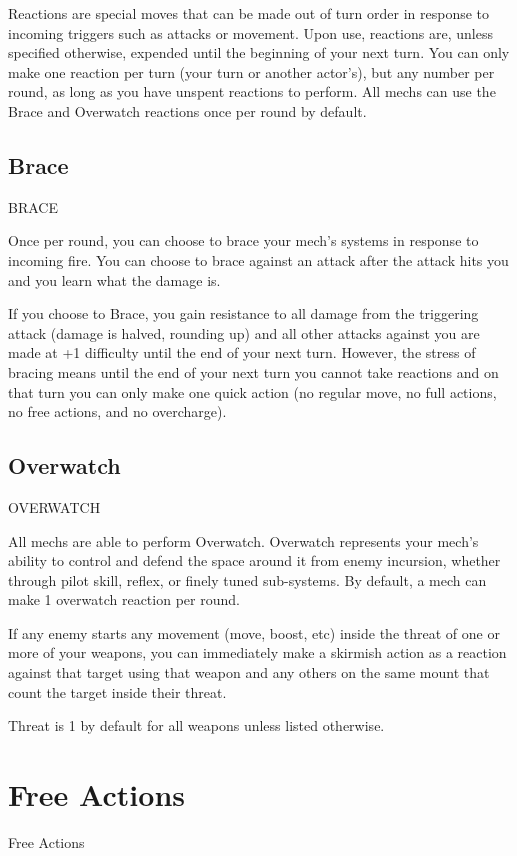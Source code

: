 Reactions are special moves that can be made out of turn order in response to incoming triggers
such as attacks or movement. Upon use, reactions are, unless specified otherwise, expended
until the beginning of your next turn. You can only make one reaction per turn (your turn or
another actor’s), but any number per round, as long as you have unspent reactions to perform.
All mechs can use the Brace and Overwatch reactions once per round by default.

\subsection{Brace}
                                                  BRACE

Once per round, you can choose to brace your mech’s systems in response to incoming fire. You
can choose to brace against an attack after the attack hits you and you learn what the damage
is.


If you choose to Brace, you gain resistance to all damage from the triggering attack (damage is
halved, rounding up) and all other attacks against you are made at +1 difficulty until the end of
your next turn. However, the stress of bracing means until the end of your next turn you cannot
take reactions and on that turn you can only make one quick action (no regular move, no full
actions, no free actions, and no overcharge).
 \subsection{Overwatch}

                                              OVERWATCH

All mechs are able to perform Overwatch. Overwatch represents your mech’s ability to control
and defend the space around it from enemy incursion, whether through pilot skill, reflex, or finely
tuned sub-systems. By default, a mech can make 1 overwatch reaction per round.


If any enemy starts any movement (move, boost, etc) inside the threat of one or more of your
weapons, you can immediately make a skirmish action as a reaction against that target using
that weapon and any others on the same mount that count the target inside their threat.


Threat is 1 by default for all weapons unless listed otherwise.

\section{Free Actions}
   Free Actions

